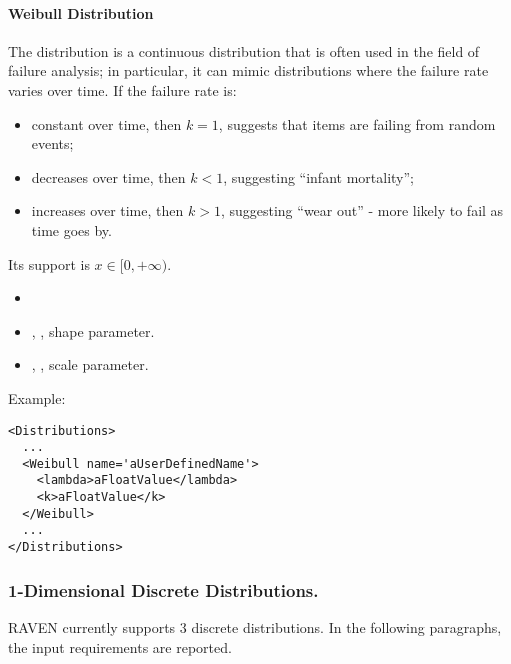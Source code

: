 \paragraph{Weibull Distribution}
\label{Weibull}
The  distribution is a continuous distribution that is often
used in the field of failure analysis; in particular, it can mimic distributions
where the failure rate varies over time.
%
If the failure rate is:
\vspace{-5mm}
\begin{itemize}
  \itemsep0em
  \item constant over time, then $k = 1$, suggests that items are failing from
  random events;
  \item decreases over time, then $k < 1$, suggesting ``infant mortality'';
  \item increases over time, then $k > 1$, suggesting ``wear out'' - more likely
  to fail as time goes by.
\end{itemize}
\vspace{-5mm}
Its support is $x \in [0, +\infty)$.

%
\attrIntro
\vspace{-5mm}
\begin{itemize}
  \itemsep0em
  \item \nameDescription
\end{itemize}
\vspace{-5mm}
\subnodesIntro
\begin{itemize}
  \item {}, , shape parameter.
  \item {}, , scale parameter.
\end{itemize}

Example:
\begin{lstlisting}[style=XML]
<Distributions>
  ...
  <Weibull name='aUserDefinedName'>
    <lambda>aFloatValue</lambda>
    <k>aFloatValue</k>
  </Weibull>
  ...
</Distributions>
\end{lstlisting}

\subsubsection{1-Dimensional Discrete Distributions.}
\label{subsubsec:1DDiscrete}
RAVEN currently supports 3 discrete distributions.
%
In the following paragraphs, the input requirements are reported.

